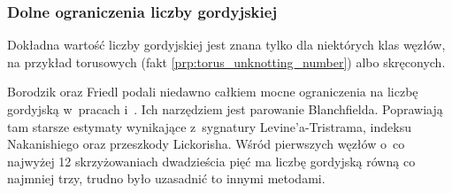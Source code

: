 
\subsubsection{Dolne ograniczenia liczby gordyjskiej}
Dokładna wartość liczby gordyjskiej jest znana tylko dla niektórych klas węzłów, na przykład torusowych (fakt \ref{prp:torus_unknotting_number}) albo skręconych.
%
%

Borodzik oraz Friedl podali niedawno całkiem mocne ograniczenia na liczbę gordyjską w~pracach \cite{borodzik2014} i~\cite{borodzik2015}.
%
%
Ich narzędziem jest parowanie Blanchfielda.
%
Poprawiają tam starsze estymaty wynikające z~sygnatury Levine'a-Tristrama, indeksu Nakanishiego oraz przeszkody Lickorisha.
%
%
%
Wśród pierwszych węzłów o~co najwyżej 12 skrzyżowaniach dwadzieścia pięć ma liczbę gordyjską równą co najmniej trzy, trudno było uzasadnić to innymi metodami.

